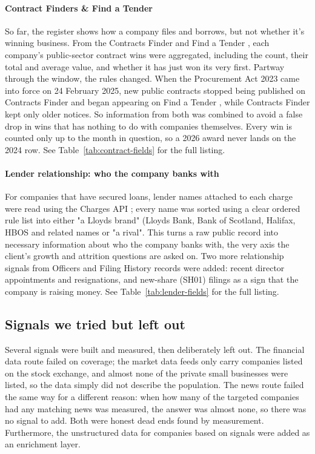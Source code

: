 \documentclass[    author={Samuel Menon Demelo; Sneha Saphala Ram Prasad; 
Viktor Ander Lindholm; Vishal Khatri},
               supervisor={Prof. Fernando Moreno-Pino},
                   degree={MSc},
                    title={Lloyds Commercial Banking Intelligence},
                 subtitle={Ranking SME Lending, Risk and Growth Prospects for Lloyds Banking Group},
                     type={},
                     year={2026}]{dissertation}
\begin{document}
\paragraph{Contract Finders \& Find a Tender}
So far, the register shows how a company files and borrows, but not whether it's winning business. From the Contracts Finder and Find a Tender \cite{contractsfinder, findatender, ocds}, each company's public-sector contract wins were aggregated, including the count, their total and average value, and whether it has just won its very first. Partway through the window, the rules changed. When the Procurement Act 2023 came into force on 24 February 2025, new public contracts stopped being published on Contracts Finder and began appearing on Find a Tender \cite{findatender}, while Contracts Finder kept only older notices. So information from both was combined to avoid a false drop in wins that has nothing to do with companies themselves. Every win is counted only up to the month in question, so a 2026 award never lands on the 2024 row. See Table~\ref{tab:contract-fields} for the full listing.

\paragraph{Lender relationship: who the company banks with}
For companies that have secured loans, lender names attached to each charge were read using the Charges API \cite{companieshouse_api}; every name was sorted using a clear ordered rule list into either "a Lloyds brand" (Lloyds Bank, Bank of Scotland, Halifax, HBOS and related names \cite{lbg_brands} or "a rival". This turns a raw public record into necessary information about who the company banks with, the very axis the client's growth and attrition questions are asked on. Two more relationship signals from Officers and Filing History records were added: recent director appointments and resignations, and new-share (SH01) filings as a sign that the company is raising money. See Table~\ref{tab:lender-fields} for the full listing.

\subsection{Signals we tried but left out}
Several signals were built and measured, then deliberately left out. The financial data route failed on coverage; the market data feeds only carry companies listed on the stock exchange, and almost none of the private small businesses were listed, so the data simply did not describe the population. The news route failed the same way for a different reason: when how many of the targeted companies had any matching news was measured, the answer was almost none, so there was no signal to add. Both were honest dead ends found by measurement. Furthermore, the unstructured data for companies based on signals were added as an enrichment layer.
\end{document}
